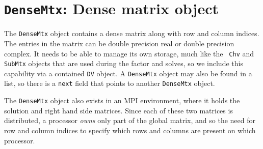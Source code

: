 \par
\chapter{{\tt DenseMtx}: Dense matrix object}
\par
The {\tt DenseMtx} object contains a dense matrix along with row and
column indices.
The entries in the matrix can be double precision real or double
precision complex.
It needs to be able to manage its own storage, much like the {\tt
Chv} and {\tt SubMtx} objects that are used during the 
factor and solves, so we include
this capability via a contained {\tt DV} object.
A {\tt DenseMtx} object may also be found in a list, so there is
a {\tt next} field that points to another {\tt DenseMtx} object.
\par
The {\tt DenseMtx} object also exists in an MPI environment,
where it holds the solution and right hand side matrices.
Since each of these two matrices is distributed, a processor
{\it owns} only part of the global matrix, and so the need for row
and column indices to specify which rows and columns are present on
which processor.
